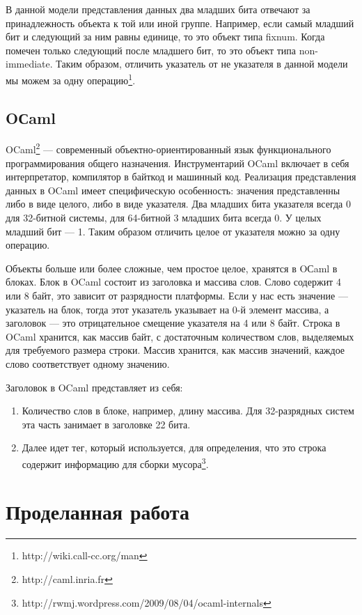 В данной модели представления данных два младших бита отвечают за принадлежность объекта к той или иной 
группе. Например, если самый младший бит и следующий за ним равны единице, то это объект типа fixnum.
Когда помечен только следующий после младшего бит, то это объект типа non-immediate.
Таким образом, отличить указатель от не указателя в данной модели мы можем за одну 
операцию\footnote{http://wiki.call-cc.org/man}.

\subsection {OСaml}

OCaml\footnote{http://caml.inria.fr} --- современный объектно-ориентированный язык функционального программирования общего назначения. 
Инструментарий OCaml включает в себя интерпретатор, компилятор в байткод и машинный код.
Реализация представления данных в OCaml имеет специфическую особенность:
значения представленны либо в виде целого, либо в виде указателя.
Два младших бита указателя всегда 0 для 32-битной системы, для 64-битной 3 младших бита всегда 0. У целых младший бит — 1. 
Таким образом отличить целое от указателя можно за одну операцию.

Объекты больше или более сложные, чем простое целое, хранятся в OСaml в блоках.
Блок в OCaml состоит из заголовка и массива слов. Слово содержит 4 или 8 байт, это зависит от разрядности платформы.
Если у нас есть значение — указатель на блок,
тогда этот указатель указывает на 0-й элемент массива, а
заголовок --- это отрицательное смещение указателя на 4 или 8 байт.
Строка в OCaml хранится, как массив байт,
с достаточным количеством слов, выделяемых для требуемого размера строки.
Массив хранится, как массив значений,
каждое слово соответствует одному значению.

Заголовок в OCaml представляет из себя:
\begin{enumerate}
\item Количество слов в блоке, например, длину массива. Для 32-разрядных систем эта часть занимает в заголовке 22 бита.
\item Далее идет тег, который используется, для определения, что это строка содержит информацию для сборки мусора\footnote{http://rwmj.wordpress.com/2009/08/04/ocaml-internals}.
\end{enumerate}
 
\section {Проделанная работа}

